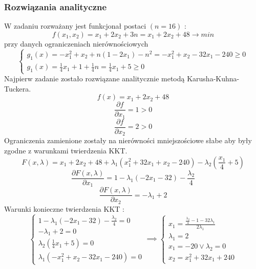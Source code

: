 \documentclass[a4paper,15pt]{article}
\begin{document}
\subsubsection{Rozwiązania analityczne}
W zadaniu rozważany jest funkcjonał postaci \( ( n = 16 ) \) :
\begin{equation*}
f(x_{1},x_{2})=x_{1} + 2x_{2} + 3n = x_{1} + 2x_{2} + 48 \rightarrow min
\end{equation*}  
przy danych ograniczeniach nierównościowych
\begin{equation*}
\begin{cases}
g_{1}(x) = -x_{1}^{2} + x_{2} + n(1 - 2x_{1} ) - n^{2} = -x_{1}^{2} + x_{2} -32x_{1} - 240 \geq 0 \\
g_{1}(x) = \frac{1}{4}x_{1} + 1 + \frac{1}{4}n = \frac{1}{4}x_{1} + 5 \geq 0
\end{cases}
\end{equation*}
Najpierw zadanie zostało rozwiązane analitycznie metodą Karusha-Kuhna-Tuckera. 
\begin{equation*}
f(x)=x_{1}+2x_{2}+48
\end{equation*}
\begin{equation*}
\frac{\partial f}{\partial x_{1}} = 1 > 0
\end{equation*}
\begin{equation*}
\frac{\partial f}{\partial x_{2}} = 2 > 0
\end{equation*}
Ograniczenia zamienione zostały na nierówności mniejszościowe słabe aby były zgodne z warunkami twierdzenia KKT. 
\begin{equation*}
F(x, \lambda) = x_{1}+2x_{2}+48+\lambda_{1}(x_{1}^{2}+32x_{1}+x_{2}-240)-\lambda_{2}(\frac{x_{1}}{4}+5)
\end{equation*}
\begin{equation*}
\frac{\partial F(x,\lambda)}{\partial x_{1}} = 1-\lambda_{1}(-2x_{1}-32)-\frac{\lambda_{2}}{4}
\end{equation*}
\begin{equation*}
\frac{\partial F(x,\lambda)}{\partial x_{2}} = - \lambda_{1}+2
\end{equation*}
Warunki konieczne twierdzenia KKT :
\begin{equation*}
\begin{cases}
1-\lambda_{1}(-2x_{1}-32)- \frac{ \lambda_{2} }{4} = 0 \\
- \lambda_{1}+2 = 0 \\
\lambda_{2}(\frac{1}{4}x_{1}+5) = 0 \\
\lambda_{1}(-x_{1}^{2}+x_{2}-32x_{1}-240) = 0
\end{cases}
\implies 
\begin{cases}
x_{1} = \frac{\frac{\lambda_{2}}{4}-1-32\lambda_{1}}{2\lambda_{1}} \\
\lambda_{1} = 2 \\
x_{1} = -20 \vee \lambda_{2} = 0 \\
x_{2} = x_{1}^{2}+32x_{1}+240
\end{cases}
\end{equation*}
\end{document}
